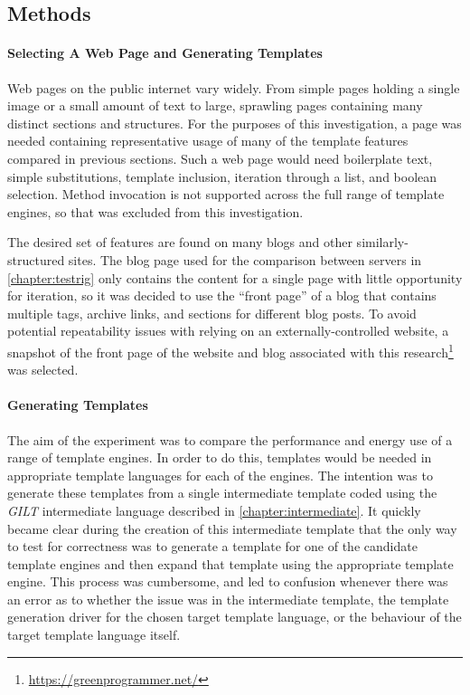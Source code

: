 \subsection{Methods}

\paragraph{Selecting A Web Page and Generating Templates}
\label{cce pages}

Web pages on the public internet vary widely. From simple pages holding a single image or a small amount of text to large, sprawling pages containing many distinct sections and structures. For the purposes of this investigation, a page was needed containing representative usage of many of the template features compared in previous sections. Such a web page would need boilerplate text, simple substitutions, template inclusion, iteration through a list, and boolean selection. Method invocation is not supported across the full range of \gls{template engine}s, so that was excluded from this investigation.

The desired set of features are found on many blogs and other similarly-structured sites. The blog page used for the comparison between servers in \autoref{chapter:testrig} only contains the content for a single page with little opportunity for iteration, so it was decided to use the \enquote{front page} of a blog that contains multiple tags, archive links, and sections for different blog posts. To avoid potential repeatability issues with relying on an externally-controlled website, a snapshot of the front page of the website and blog associated with this research\footnote{\url{https://greenprogrammer.net/}} was selected.

\paragraph{Generating Templates}
\label{cce gilt}

The aim of the experiment was to compare the performance and energy use of a range of \gls{template engine}s. In order to do this, templates would be needed in appropriate \gls{template language}s for each of the engines. The intention was to generate these templates from a single intermediate template coded using the \emph{GILT} intermediate language described in \autoref{chapter:intermediate}. It quickly became clear during the creation of this intermediate template that the only way to test for correctness was to generate a template for one of the candidate \gls{template engine}s and then expand that template using the appropriate \gls{template engine}. This process was cumbersome, and led to confusion whenever there was an error as to whether the issue was in the intermediate template, the template generation driver for the chosen target \gls{template language}, or the behaviour of the target \gls{template language} itself.

